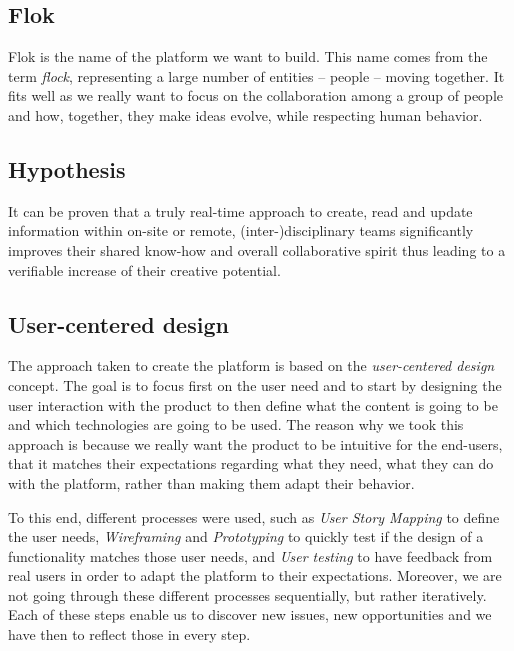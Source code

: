 \documentclass[a4paper,12pt, oneside]{article}
\begin{document}
\subsection{Flok}
Flok is the name of the platform we want to build.
This name comes from the term \emph{flock}, representing a large number of entities – people – moving together.
It fits well as we really want to focus on the collaboration among a group of people and how, together, they make ideas evolve, while respecting human behavior.

\subsection{Hypothesis}
\label{hypothesis}
It can be proven that a truly real-time approach to create, read and update information within on-site or remote, (inter-)disciplinary teams significantly improves their shared know-how and overall collaborative spirit thus leading to a verifiable increase of their creative potential.

\subsection{User-centered design}
The approach taken to create the platform is based on the \emph{user-centered design} concept.
The goal is to focus first on the user need and to start by designing the user interaction with the product to then define what the content is going to be and which technologies are going to be used.
The reason why we took this approach is because we really want the product to be intuitive for the end-users, that it matches their expectations regarding what they need, what they can do with the platform, rather than making them adapt their behavior.

To this end, different processes were used, such as \emph{User Story Mapping} to define the user needs, \emph{Wireframing} and \emph{Prototyping} to quickly test if the design of a functionality matches those user needs, and \emph{User testing} to have feedback from real users in order to adapt the platform to their expectations.
Moreover, we are not going through these different processes sequentially, but rather iteratively.
Each of these steps enable us to discover new issues, new opportunities and we have then to reflect those in every step.

\end{document}
